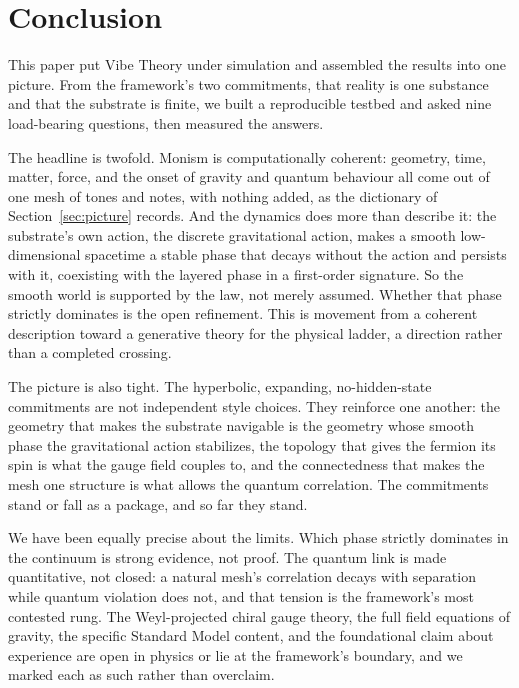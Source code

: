 \section{Conclusion}
\label{sec:conclusion}

This paper put Vibe Theory under simulation and assembled the results into one picture. From the framework's two commitments, that reality is one substance and that the substrate is finite, we built a reproducible testbed and asked nine load-bearing questions, then measured the answers.

The headline is twofold. Monism is computationally coherent: geometry, time, matter, force, and the onset of gravity and quantum behaviour all come out of one mesh of tones and notes, with nothing added, as the dictionary of Section~\ref{sec:picture} records. And the dynamics does more than describe it: the substrate's own action, the discrete gravitational action, makes a smooth low-dimensional spacetime a stable phase that decays without the action and persists with it, coexisting with the layered phase in a first-order signature. So the smooth world is supported by the law, not merely assumed. Whether that phase strictly dominates is the open refinement. This is movement from a coherent description toward a generative theory for the physical ladder, a direction rather than a completed crossing.

The picture is also tight. The hyperbolic, expanding, no-hidden-state commitments are not independent style choices. They reinforce one another: the geometry that makes the substrate navigable is the geometry whose smooth phase the gravitational action stabilizes, the topology that gives the fermion its spin is what the gauge field couples to, and the connectedness that makes the mesh one structure is what allows the quantum correlation. The commitments stand or fall as a package, and so far they stand.

We have been equally precise about the limits. Which phase strictly dominates in the continuum is strong evidence, not proof. The quantum link is made quantitative, not closed: a natural mesh's correlation decays with separation while quantum violation does not, and that tension is the framework's most contested rung. The Weyl-projected chiral gauge theory, the full field equations of gravity, the specific Standard Model content, and the foundational claim about experience are open in physics or lie at the framework's boundary, and we marked each as such rather than overclaim.

